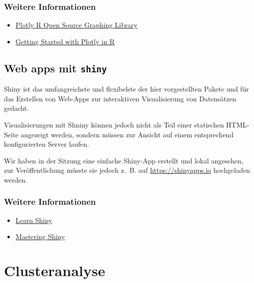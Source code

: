 \documentclass[
  ngerman,
]{article}
\providecommand{\tightlist}{%
  \setlength{\itemsep}{0pt}\setlength{\parskip}{0pt}}
\begin{document}
\hypertarget{weitere-informationen-1}{%
\subsubsection{Weitere Informationen}\label{weitere-informationen-1}}

\begin{itemize}
\tightlist
\item
  \href{https://plotly.com/r/}{Plotly R Open Source Graphing Library}
\item
  \href{https://plotly.com/r/getting-started/}{Getting Started with Plotly in R}
\end{itemize}

\hypertarget{web-apps-mit-shiny}{%
\subsection{\texorpdfstring{Web apps mit \texttt{shiny}}{Web apps mit shiny}}\label{web-apps-mit-shiny}}

Shiny ist das umfangreichste und flexibelste der hier vorgestellten Pakete und für das Erstellen von Web-Apps zur interaktiven Visualisierung von Datensätzen gedacht.

Visualisierungen mit Shniny können jedoch nicht als Teil einer statischen HTML-Seite angezeigt werden, sondern müssen zur Ansicht auf einem entsprechend konfigurierten Server laufen.

Wir haben in der Sitzung eine einfache Shiny-App erstellt und lokal angesehen, zur Veröffentlichung müsste sie jedoch z.~B. auf \url{https://shinyapps.io} hochgeladen werden.

\hypertarget{weitere-informationen-2}{%
\subsubsection{Weitere Informationen}\label{weitere-informationen-2}}

\begin{itemize}
\tightlist
\item
  \href{https://shiny.rstudio.com/tutorial/}{Learn Shiny}
\item
  \href{https://mastering-shiny.org/}{Mastering Shiny}
\end{itemize}

\hypertarget{clusteranalyse}{%
\section{Clusteranalyse}\label{clusteranalyse}}
\end{document}
